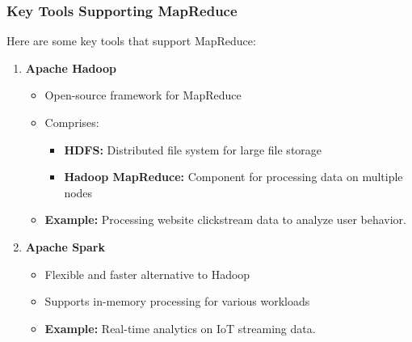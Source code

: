 \documentclass[aspectratio=169]{beamer}
\begin{document}
\begin{frame}[fragile]
    \frametitle{Key Tools Supporting MapReduce}

    Here are some key tools that support MapReduce:
    
    \begin{enumerate}
        \item \textbf{Apache Hadoop}
        \begin{itemize}
            \item Open-source framework for MapReduce
            \item Comprises:
            \begin{itemize}
                \item \textbf{HDFS:} Distributed file system for large file storage
                \item \textbf{Hadoop MapReduce:} Component for processing data on multiple nodes
            \end{itemize}
            \item \textbf{Example:} Processing website clickstream data to analyze user behavior.
        \end{itemize}
        
        \item \textbf{Apache Spark}
        \begin{itemize}
            \item Flexible and faster alternative to Hadoop
            \item Supports in-memory processing for various workloads
            \item \textbf{Example:} Real-time analytics on IoT streaming data.
        \end{itemize}
    \end{enumerate}
\end{frame}
\end{document}
